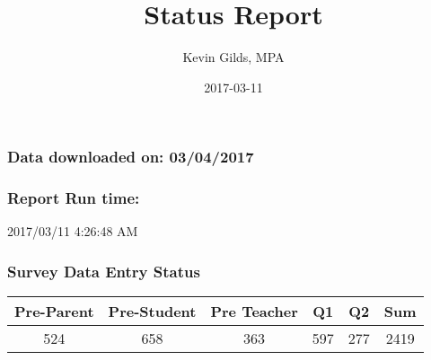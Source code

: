 \documentclass[]{article}
\title{Status Report}
\author{Kevin Gilds, MPA}
\date{2017-03-11}
\begin{document}
\maketitle

\subsubsection{Data downloaded on:
03/04/2017}\label{data-downloaded-on-03042017}

\subsubsection{Report Run time:}\label{report-run-time}

2017/03/11 4:26:48 AM

\subsubsection{Survey Data Entry Status}\label{survey-data-entry-status}

\begin{longtable}[]{@{}cccccc@{}}
\toprule
\begin{minipage}[b]{0.15\columnwidth}\centering\strut
Pre-Parent\strut
\end{minipage} & \begin{minipage}[b]{0.16\columnwidth}\centering\strut
Pre-Student\strut
\end{minipage} & \begin{minipage}[b]{0.16\columnwidth}\centering\strut
Pre Teacher\strut
\end{minipage} & \begin{minipage}[b]{0.06\columnwidth}\centering\strut
Q1\strut
\end{minipage} & \begin{minipage}[b]{0.06\columnwidth}\centering\strut
Q2\strut
\end{minipage} & \begin{minipage}[b]{0.06\columnwidth}\centering\strut
Sum\strut
\end{minipage}\tabularnewline
\midrule
\endhead
\begin{minipage}[t]{0.15\columnwidth}\centering\strut
524\strut
\end{minipage} & \begin{minipage}[t]{0.16\columnwidth}\centering\strut
658\strut
\end{minipage} & \begin{minipage}[t]{0.16\columnwidth}\centering\strut
363\strut
\end{minipage} & \begin{minipage}[t]{0.06\columnwidth}\centering\strut
597\strut
\end{minipage} & \begin{minipage}[t]{0.06\columnwidth}\centering\strut
277\strut
\end{minipage} & \begin{minipage}[t]{0.06\columnwidth}\centering\strut
2419\strut
\end{minipage}\tabularnewline
\bottomrule
\end{longtable}
\end{document}

